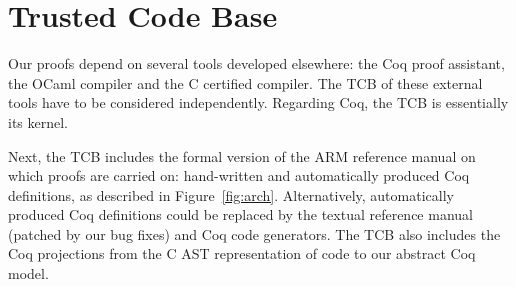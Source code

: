 \section{Trusted Code Base}


Our proofs depend on several tools developed elsewhere:
the Coq proof assistant,
the OCaml compiler and the \compcert C certified compiler.
The TCB of these external tools have to be considered independently.
Regarding Coq, the TCB is essentially its kernel.

Next, the TCB includes the formal version of the ARM reference manual
on which proofs are carried on:
hand-written and automatically produced Coq definitions,
as described in Figure~\ref{fig:arch}.
Alternatively,
automatically produced Coq definitions could be replaced by
the textual reference manual (patched by our bug fixes)
and Coq code generators.
The TCB also includes
the Coq projections from the \compcert C AST representation of \simlight code
to our abstract Coq model.





